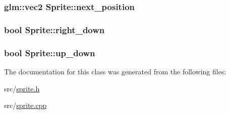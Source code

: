 \subsubsection[{next\+\_\+position}]{\setlength{\rightskip}{0pt plus 5cm}glm\+::vec2 Sprite\+::next\+\_\+position\hspace{0.3cm}{\ttfamily [private]}}\label{class_sprite_a9f3431bd938e2f2097833bb014182db6}
\hypertarget{class_sprite_ad3df5ad11bc9883e55cfea8d48a7166f}{}
\subsubsection[{right\+\_\+down}]{\setlength{\rightskip}{0pt plus 5cm}bool Sprite\+::right\+\_\+down\hspace{0.3cm}{\ttfamily [private]}}\label{class_sprite_ad3df5ad11bc9883e55cfea8d48a7166f}
\hypertarget{class_sprite_a41fe0a8d0b923c47bdf6f99806f763f4}{}
\subsubsection[{up\+\_\+down}]{\setlength{\rightskip}{0pt plus 5cm}bool Sprite\+::up\+\_\+down\hspace{0.3cm}{\ttfamily [private]}}\label{class_sprite_a41fe0a8d0b923c47bdf6f99806f763f4}


The documentation for this class was generated from the following files\+:\begin{DoxyCompactItemize}
\item 
src/\hyperlink{sprite_8h}{sprite.\+h}\item 
src/\hyperlink{sprite_8cpp}{sprite.\+cpp}\end{DoxyCompactItemize}
